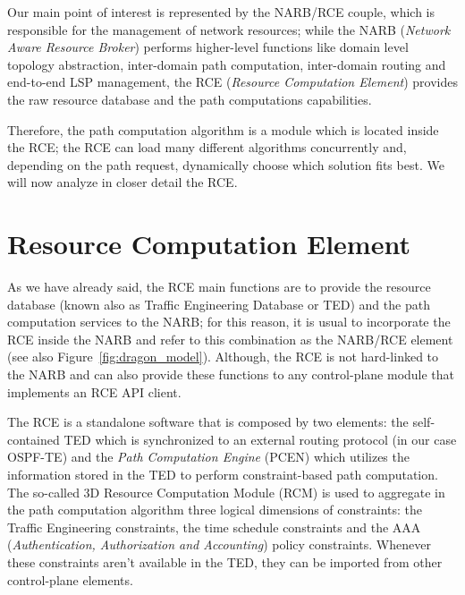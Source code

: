\documentclass[10pt,a4paper]{report}
\begin{document}
Our main point of interest is represented by the NARB/RCE couple,
which is responsible for the management of network resources; while
the NARB (\textit{Network Aware Resource Broker}) performs
higher-level functions like domain level topology abstraction,
inter-domain path computation, inter-domain routing and end-to-end LSP
management, the RCE (\textit{Resource Computation Element}) provides
the raw resource database and the path computations capabilities.

Therefore, the path computation algorithm is a module which is
located inside the RCE; the RCE can load many different algorithms
concurrently and, depending on the path request, dynamically choose
which solution fits best. We will now analyze in closer detail the
RCE.

\section{Resource Computation Element}

As we have already said, the RCE main functions are to provide the
resource database (known also as Traffic Engineering Database or TED)
and the path computation services to the NARB; for this reason, it is
usual to incorporate the RCE inside the NARB and refer to this
combination as the NARB/RCE element (see also
Figure~\ref{fig:dragon_model}). Although, the RCE is not hard-linked
to the NARB and can also provide these functions to any control-plane
module that implements an RCE API client.

The RCE is a standalone software that is composed by two elements: the
self-contained TED which is synchronized to an external routing
protocol (in our case OSPF-TE) and the \textit{Path Computation
  Engine} (PCEN) which utilizes the information stored in the TED to
perform constraint-based path computation. The so-called 3D Resource
Computation Module (RCM) is used to aggregate in the path computation
algorithm three logical dimensions of constraints: the Traffic
Engineering constraints, the time schedule constraints and the AAA
(\textit{Authentication, Authorization and Accounting}) policy
constraints. Whenever these constraints aren't available in the TED,
they can be imported from other control-plane elements.\\
\end{document}
